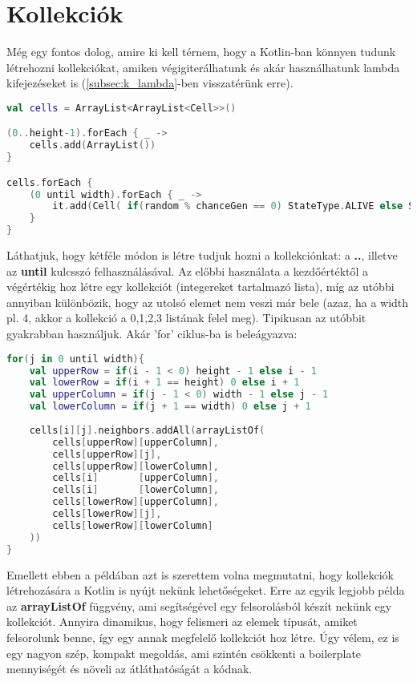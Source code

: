 \section{Kollekciók}
\label{sec:k_collection}

Még egy fontos dolog, amire ki kell térnem, hogy a Kotlin-ban könnyen tudunk létrehozni kollekciókat, amiken végigiterálhatunk és akár használhatunk lambda kifejezéseket is (\ref{subsec:k_lambda}-ben visszatérünk erre).
\scriptsize
\begin{lstlisting}[language = Kotlin]
val cells = ArrayList<ArrayList<Cell>>()

(0..height-1).forEach { _ ->
	cells.add(ArrayList())
}

cells.forEach {
	(0 until width).forEach { _ ->
		it.add(Cell( if(random % chanceGen == 0) StateType.ALIVE else StateType.DEAD ))
	}
}
\end{lstlisting}
\normalsize
Láthatjuk, hogy kétféle módon is létre tudjuk hozni a kollekciónkat: a \textbf{..}, illetve az \textbf{until} kulcsszó felhasználásával. Az előbbi használata a kezdőértéktől a végértékig hoz létre egy kollekciót (integereket tartalmazó lista), míg az utóbbi annyiban különbözik, hogy az utolsó elemet nem veszi már bele (azaz, ha a width pl. 4, akkor a kollekció a {0,1,2,3} listának felel meg). Tipikusan az utóbbit gyakrabban használjuk. Akár 'for' ciklus-ba is beleágyazva:
\scriptsize
\begin{lstlisting}[language = Kotlin]
for(j in 0 until width){
	val upperRow = if(i - 1 < 0) height - 1 else i - 1
	val lowerRow = if(i + 1 == height) 0 else i + 1
	val upperColumn = if(j - 1 < 0) width - 1 else j - 1
	val lowerColumn = if(j + 1 == width) 0 else j + 1
	
	cells[i][j].neighbors.addAll(arrayListOf(
		cells[upperRow][upperColumn],
		cells[upperRow][j],
		cells[upperRow][lowerColumn],
		cells[i]       [upperColumn],
		cells[i]       [lowerColumn],
		cells[lowerRow][upperColumn],
		cells[lowerRow][j],
		cells[lowerRow][lowerColumn]
	))
}
\end{lstlisting}
\normalsize
Emellett ebben a példában azt is szerettem volna megmutatni, hogy kollekciók létrehozására a Kotlin is nyújt nekünk lehetőségeket. Erre az egyik legjobb példa az \textbf{arrayListOf} függvény, ami segítségével egy felsorolásból készít nekünk egy kollekciót. Annyira dinamikus, hogy felismeri az elemek típusát, amiket felsorolunk benne, így egy annak megfelelő kollekciót hoz létre. Úgy vélem, ez is egy nagyon szép, kompakt megoldás, ami szintén csökkenti a boilerplate mennyiségét és növeli az átláthatóságát a kódnak.

